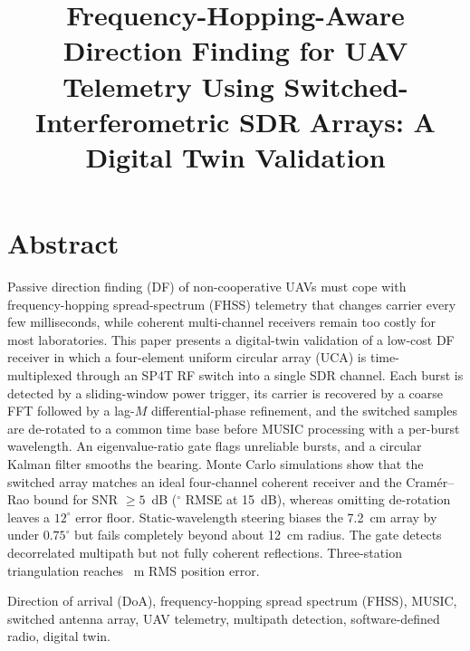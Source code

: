 \documentclass[conference]{IEEEtran}
\begin{document}
\title{Frequency-Hopping-Aware Direction Finding for UAV Telemetry Using Switched-Interferometric SDR Arrays: A Digital Twin Validation}

\author{
}

\maketitle

\section*{Abstract}
Passive direction finding (DF) of non-cooperative UAVs must cope with frequency-hopping spread-spectrum (FHSS) telemetry that changes carrier every few milliseconds, while coherent multi-channel receivers remain too costly for most laboratories. This paper presents a digital-twin validation of a low-cost DF receiver in which a four-element uniform circular array (UCA) is time-multiplexed through an SP4T RF switch into a single SDR channel. Each burst is detected by a sliding-window power trigger, its carrier is recovered by a coarse FFT followed by a lag-$M$ differential-phase refinement, and the switched samples are de-rotated to a common time base before MUSIC processing with a per-burst wavelength. An eigenvalue-ratio gate flags unreliable bursts, and a circular Kalman filter smooths the bearing. Monte Carlo simulations show that the switched array matches an ideal four-channel coherent receiver and the Cram\'er--Rao bound for SNR $\ge 5$~dB (\rmseFifteen$^\circ$ RMSE at 15~dB), whereas omitting de-rotation leaves a $12^\circ$ error floor. Static-wavelength steering biases the 7.2~cm array by under $0.75^\circ$ but fails completely beyond about 12~cm radius. The gate detects decorrelated multipath but not fully coherent reflections. Three-station triangulation reaches \trk~m RMS position error.

\vspace{0.8ex}
\begin{IEEEkeywords}
Direction of arrival (DoA), frequency-hopping spread spectrum (FHSS), MUSIC, switched antenna array, UAV telemetry, multipath detection, software-defined radio, digital twin.
\end{IEEEkeywords}
\end{document}
